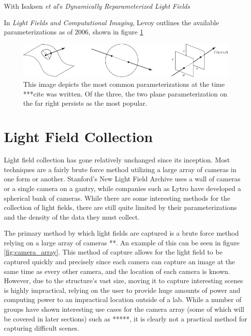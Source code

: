\documentclass[12pt]{report}
\begin{document}
With Isaksen \emph{et al}'s \emph{Dynamically Reparameterized Light Fields}

In \emph{Light Fields and Computational Imaging}, Levoy outlines the available parameterizations as of 2006, shown in figure \ref{fig:parameterization_visual}

\begin{figure}[!ht]
	\centering
	\includegraphics[scale=0.75]{Light-field-parameterizations.png}
	\caption{This image depicts the most common parameterizations at the time ***cite was written. Of the three, the two plane parameterization on the far right persists as the most popular.}
	\label{fig:parameterization_visual}
\end{figure}

\section{Light Field Collection}
Light field collection has gone relatively unchanged since its inception. Most techniques are a fairly brute force method utilizing a large array of cameras in one form or another. Stanford's New Light Field Archive uses a wall of cameras or a single camera on a gantry, while companies such as Lytro have developed a spherical bank of cameras. While there are some interesting methods for the collection of light fields, there are still quite limited by their parameterizations and the density of the data they must collect. 

The primary method by which light fields are captured is a brute force method relying on a large array of cameras \cite{Ng06}**. An example of this can be seen in figure \ref{fig:camera_array}. This method of capture allows for the light field to be captured quickly and precisely since each camera can capture an image at the same time as every other camera, and the location of each camera is known. However, due to the structure's vast size, moving it to capture interesting scenes is highly impractical, relying on the user to provide huge amounts of power and computing power to an impractical location outside of a lab. While a number of groups have shown interesting use cases for the camera array (some of which will be covered in later sections) such as \cite{Ng06}*****, it is clearly not a practical method for capturing difficult scenes.
\end{document}
